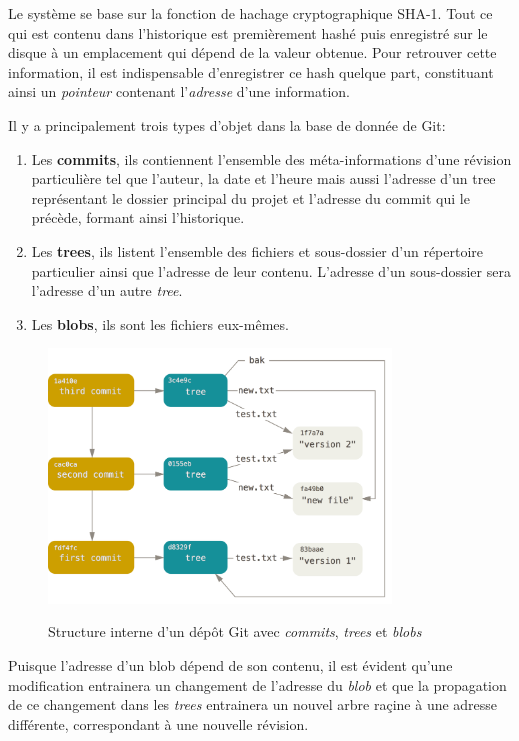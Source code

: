 \documentclass[11pt,a4paper]{article}
\begin{document}
Le système se base sur la fonction de hachage cryptographique SHA-1.
Tout ce qui est contenu dans l'historique est premièrement hashé puis enregistré sur le disque à un emplacement qui dépend de la valeur obtenue.
Pour retrouver cette information, il est indispensable d'enregistrer ce hash quelque part, constituant ainsi un \textit{pointeur} contenant l'\textit{adresse} d'une information.

Il y a principalement trois types d'objet dans la base de donnée de Git:

\begin{enumerate}
	\item Les {\bf commits},
	ils contiennent l'ensemble des méta-informations d'une révision particulière tel que l'auteur, la date et l'heure mais aussi l'adresse d'un tree représentant le dossier principal du projet et l'adresse du commit qui le précède, formant ainsi l'historique.
	
	\item Les {\bf trees},
	ils listent l'ensemble des fichiers et sous-dossier d'un répertoire particulier ainsi que l'adresse de leur contenu.
	L'adresse d'un sous-dossier sera l'adresse d'un autre \textit{tree}.
	
	\item Les {\bf blobs},
	ils sont les fichiers eux-mêmes.
\end{enumerate}

\begin{figure}[H]
\begin{center}
\includegraphics[width=9.1cm]{img_structure} \cite{progit}
\caption{Structure interne d'un dépôt Git avec \textit{commits}, \textit{trees} et \textit{blobs}}
\end{center}
\end{figure}

Puisque l'adresse d'un blob dépend de son contenu, il est évident qu'une modification entrainera un changement de l'adresse du \textit{blob} et que la propagation de ce changement dans les \textit{trees} entrainera un nouvel arbre raçine à une adresse différente, correspondant à une nouvelle révision.
\end{document}
